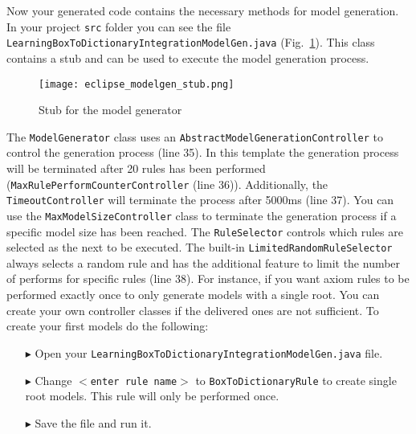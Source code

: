  

  
  
Now your generated code contains the necessary methods for model generation.
In your project \texttt{src} folder you can see the file
\texttt{Learning\-Box\-To\-Dictionary\-Integration\-Model\-Gen.java}
(Fig.~\ref{eclipse:modelgen}).
This class contains a stub and can be used to execute the model generation process.
 

 
\begin{figure}[htbp]
\renewcommand\figurename{Figure}
\begin{center}
\texttt{[image: eclipse\_modelgen\_stub.png]}
\caption{Stub for the model generator}
\label{eclipse:modelgen}
\end{center}
\end{figure}

The \texttt{ModelGenerator} class uses an
\texttt{AbstractModelGenerationController} to control the generation process (line 35). In
this template the generation process will be terminated after 20 rules has been
performed (\texttt{Max\-Rule\-Perform\-Counter\-Controller} (line 36)). 
Additionally, the \texttt{Time\-out\-Con\-trol\-ler} will terminate the process after 5000ms (line 37). You can use the \texttt{Max\-Model\-Size\-Controller} class to terminate the generation process if
a specific model size has been reached. 
The \texttt{RuleSelector} controls which rules are selected as the next to be executed. 
The built-in \texttt{LimitedRandomRuleSelector} always selects a random rule and has the additional feature to limit the number of performs for specific rules (line 38).
For instance, if you want axiom rules to be performed exactly once to only generate models with a single root. 
You can create your own controller classes if the delivered ones are not sufficient. 
To create your first models do the following:


\begin{itemize}

\item[$\blacktriangleright$] Open your
\texttt{LearningBoxToDictionaryIntegrationModelGen.java} file.

\item[$\blacktriangleright$] Change \texttt{$<$enter rule name$>$} to \texttt{BoxToDictionaryRule} to
create single root models. This rule will only be performed once.

\item[$\blacktriangleright$] Save the file and run it.

\end{itemize}

